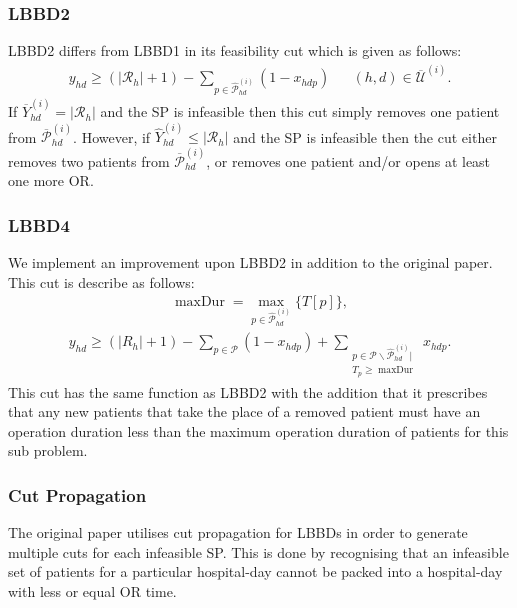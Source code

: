 \subsubsection{LBBD2}
LBBD2 differs from LBBD1 in its feasibility cut which is given as follows:
\begin{align*}
    y_{hd} \geq (|\mathcal{R}_h| + 1) - \sum\limits_{p \in \hat{\mathcal{P}}_{hd}^{(i)}}(1-x_{hdp}) && (h,d) \in \overline{\mathcal{U}}^{(i)}.
\end{align*}
If $\overline{Y}_{hd}^{(i)} = |\mathcal{R}_h|$ and the SP is infeasible then this cut simply removes one patient from $\overline{\mathcal{P}}_{hd}^{(i)}$. However, if $\hat{Y}_{hd}^{(i)} \le |\mathcal{R}_h|$ and the SP is infeasible then the cut either removes two patients from $\overline{\mathcal{P}}_{hd}^{(i)}$, or removes one patient and/or opens at least one more OR.
\subsubsection{LBBD4}
We implement an improvement upon LBBD2 in addition to the original paper. This cut is describe as follows:
\begin{align*}
    \operatorname{maxDur} = \max\limits_{p \in \hat{\mathcal{P}}^{(i)}_{hd}}\{T[p]\},
\end{align*}
\begin{align*}
    y_{hd} \geq (|R_h| + 1) - \sum\limits_{p \in \mathcal{P}}(1-x_{hdp}) + \sum\limits_{\substack{p \in \mathcal{P}\backslash\hat{\mathcal{P}}^{(i)}_{hd} \big|\\
    T_p \geq \operatorname{maxDur}}}x_{hdp}.
\end{align*}
This cut has the same function as LBBD2 with the addition that it prescribes that any new patients that take the place of a removed patient must have an operation duration less than the maximum operation duration of patients for this sub problem.
\subsubsection{Cut Propagation}
The original paper utilises cut propagation for LBBDs in order to generate multiple cuts for each infeasible SP. This is done by recognising that an infeasible set of patients for a particular hospital-day cannot be packed into a hospital-day with less or equal OR time.
